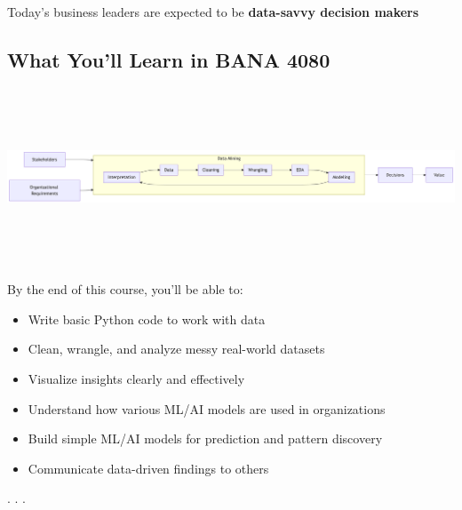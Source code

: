 \documentclass[
  letterpaper,
  DIV=11,
  numbers=noendperiod]{scrartcl}
\providecommand{\tightlist}{%
  \setlength{\itemsep}{0pt}\setlength{\parskip}{0pt}}
\begin{document}
\begin{tcolorbox}[enhanced jigsaw, colbacktitle=quarto-callout-important-color!10!white, opacityback=0, colback=white, opacitybacktitle=0.6, toptitle=1mm, left=2mm, bottomrule=.15mm, breakable, bottomtitle=1mm, rightrule=.15mm, titlerule=0mm, title=\textcolor{quarto-callout-important-color}{\faExclamation}\hspace{0.5em}{Important}, coltitle=black, colframe=quarto-callout-important-color-frame, arc=.35mm, toprule=.15mm, leftrule=.75mm]

{Today's business leaders are expected to be \textbf{data-savvy decision
makers}}

\end{tcolorbox}

\subsection{What You'll Learn in BANA
4080}\label{what-youll-learn-in-bana-4080}

\includegraphics[width=17.19in,height=2.06in]{w1_tuesday_intro_files/figure-latex/mermaid-figure-1.png}

By the end of this course, you'll be able to:

\begin{itemize}
\tightlist
\item
  Write basic Python code to work with data
\item
  Clean, wrangle, and analyze messy real-world datasets
\item
  Visualize insights clearly and effectively
\item
  Understand how various ML/AI models are used in organizations
\item
  Build simple ML/AI models for prediction and pattern discovery
\item
  Communicate data-driven findings to others
\end{itemize}

. . .
\end{document}
